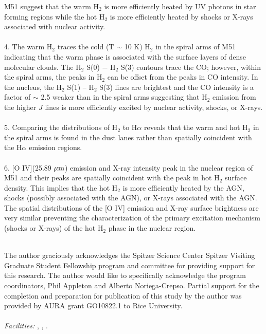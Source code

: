 \documentclass[manuscript]{aastex}
\begin{document}
M51 suggest that the warm H$_2$ is more efficiently heated 
by UV photons in star forming regions while the hot H$_2$ is 
more efficiently heated by shocks or X-rays associated with nuclear activity.\\
\\
4. The warm H$_2$ traces the cold (T $\sim$ 10 K) H$_2$ 
in the spiral arms of M51 indicating that the warm phase is associated 
with the surface layers of dense molecular clouds.  The $\mathrm{H_2}$ S(0) $-$
$\mathrm{H_2}$ S(3) contours trace the CO; however, within the spiral
arms, the peaks in $\mathrm{H_2}$ can be offset from the peaks in CO
intensity.  In the nucleus, the $\mathrm{H_2}$ S(1) -- $\mathrm{H_2}$
S(3) lines are brightest and the CO intensity is a factor of $\sim$
2.5 weaker than in the spiral arms suggesting that $\mathrm{H_2}$
emission from the higher $J$ lines is more efficiently excited by nuclear activity, shocks, or X-rays.\\
\\
5.  Comparing the distributions of H$_2$ to H$\alpha$ reveals
that the warm and hot H$_2$ in the spiral arms is found in the dust lanes
rather than spatially coincident with the H$\alpha$ emission regions.\\
\\
6.  [O IV](25.89 $\mbox{$\mu$m}$) emission and X-ray
intensity peak in the nuclear region of M51 and their 
peaks are spatially coincident with the peak in hot H$_2$ 
surface density.  This implies that the hot H$_2$ 
is more efficiently heated by the AGN, shocks (possibly associated
with the AGN), or X-rays associated with the AGN.  The spatial
distributions of the [O IV] emission and X-ray surface brightness are
very similar preventing the characterization of the primary excitation 
mechanism (shocks or X-rays) of the hot H$_2$ phase in the nuclear region.\\ 
\\

\acknowledgments

The author graciously acknowledges the Spitzer Science Center Spitzer
Visiting Graduate Student Fellowship program and committee for
providing support for this research.  The author would like to
specifically acknowledge the program coordinators, Phil Appleton and
Alberto Noriega-Crepso. 
Partial support for the completion and preparation for publication of this study by the
author was provided by AURA grant GO10822.1 to Rice
University.\\ 
\\
{\it Facilities:} , ,
.
\end{document}
